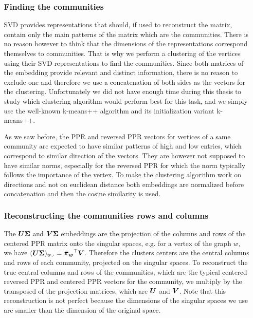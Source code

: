 \subsubsection{Finding the communities}
SVD provides representations that should, if used to reconstruct the matrix, contain only the main patterns of the matrix which are the communities. There is no reason however to think that the dimensions of the representations correspond themselves to communities. That is why we perform a clustering of the vertices using their SVD representations to find the communities. Since both matrices of the embedding provide relevant and distinct information, there is no reason to exclude one and therefore we use a concatenation of both sides as the vectors for the clustering. 
Unfortunately we did not have enough time during this thesis to study which clustering algorithm would perform best for this task, and we simply use the well-known k-means++ algorithm and its initialization variant k-means++.

As we saw before, the PPR and reversed PPR vectors for vertices of a same community are expected to have similar patterns of high and low entries, which correspond to similar direction of the vectors. They are however not supposed to have similar norms, especially for the reversed PPR for which the norm typically follows the importance of the vertex. To make the clustering algorithm work on directions and not on euclidean distance both embeddings are normalized before concatenation and then the cosine similarity is used.

\subsubsection{Reconstructing the communities rows and columns}
The $\boldsymbol{U}\boldsymbol{\Sigma}$ and $\boldsymbol{V}\boldsymbol{\Sigma}$ embeddings are the projection of the columns and rows of the centered PPR matrix onto the singular spaces, e.g. for a vertex of the graph $w$, we have $ (\boldsymbol{U}\boldsymbol{\Sigma})_{w, \cdot} = \boldsymbol{\Bar{\pi}_w}^\top\boldsymbol{V}$. Therefore the clusters centers are the central columns and rows of each community, projected on the singular spaces. To reconstruct the true central columns and rows of the communities, which are the typical centered reversed PPR and centered PPR vectors for the community, we multiply by the transposed of the projection matrices, which are $\boldsymbol{U}$ and $\boldsymbol{V}$. Note that this reconstruction is not perfect because the dimensions of the singular spaces we use are smaller than the dimension of the original space.

